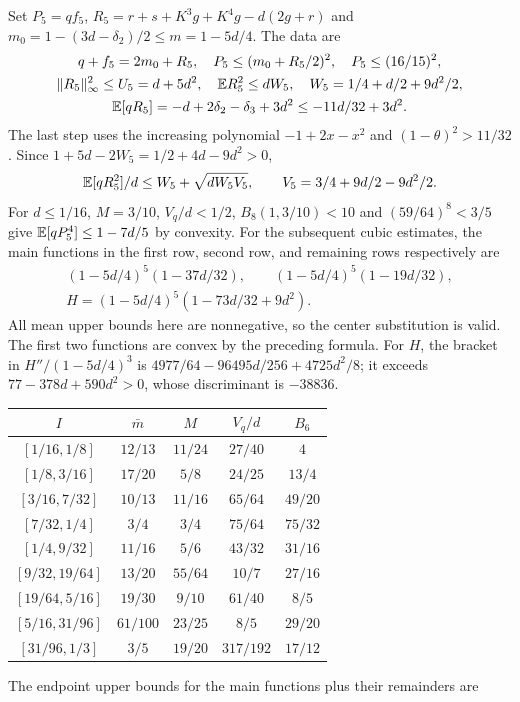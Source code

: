 Set $P_5=qf_5$, $R_5=r+s+K^3g+K^4g-d(2g+r)$ and
$m_0=1-(3d-\delta_{2})/2\le m=1-5d/4$. The data are
\begin{gather*}
 q+f_5=2m_0+R_5,\quad P_5\le(m_0+R_5/2)^2,\quad P_5\le(16/15)^2,\\
 \|R_5\|_\infty^2\le U_5=d+5d^2,\quad
 \mathbb E R_5^2\le dW_5,\quad W_5=1/4+d/2+9d^2/2,\\
 \mathbb E[qR_5]=-d+2\delta_{2}-\delta_{3}+3d^2\le-11d/32+3d^2.
\end{gather*}
The last step uses the increasing polynomial $-1+2x-x^2$ and
$(1-\theta)^2>11/32$. Since $1+5d-2W_5=1/2+4d-9d^2>0$,
\[
 \mathbb E[qR_5^2]/d\le W_5+\sqrt{dW_5V_5},\qquad V_5=3/4+9d/2-9d^2/2.
\]
For $d\le1/16$, $M=3/10$, $V_q/d<1/2$, $B_8(1,3/10)<10$ and
$(59/64)^8<3/5$ give $\mathbb E[qP_5^4]\le1-7d/5$ by convexity.
For the subsequent cubic estimates, the main functions in the first row,
second row, and remaining rows respectively are
\begin{gather*}
 (1-5d/4)^5(1-37d/32),\qquad (1-5d/4)^5(1-19d/32),\\
 H=(1-5d/4)^5(1-73d/32+9d^2).
\end{gather*}
All mean upper bounds here are nonnegative, so the center substitution is
valid. The first two functions are convex by the preceding formula.
For $H$, the bracket in $H''/(1-5d/4)^3$ is
$4977/64-96495d/256+4725d^2/8$; it exceeds
$77-378d+590d^2>0$, whose discriminant is $-38836$.
\begin{center}\small
\begin{tabular}{@{}ccccc@{}}\toprule
$I$&$\bar m$&$M$&$V_q/d$&$B_6$\\\midrule
$[1/16,1/8]$&$12/13$&$11/24$&$27/40$&$4$\\
$[1/8,3/16]$&$17/20$&$5/8$&$24/25$&$13/4$\\
$[3/16,7/32]$&$10/13$&$11/16$&$65/64$&$49/20$\\
$[7/32,1/4]$&$3/4$&$3/4$&$75/64$&$75/32$\\
$[1/4,9/32]$&$11/16$&$5/6$&$43/32$&$31/16$\\
$[9/32,19/64]$&$13/20$&$55/64$&$10/7$&$27/16$\\
$[19/64,5/16]$&$19/30$&$9/10$&$61/40$&$8/5$\\
$[5/16,31/96]$&$61/100$&$23/25$&$8/5$&$29/20$\\
$[31/96,1/3]$&$3/5$&$19/20$&$317/192$&$17/12$\\\bottomrule
\end{tabular}
\end{center}
The endpoint upper bounds for the main functions plus their remainders are
